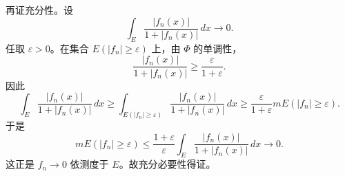 \documentclass{article}
\begin{document}
再证充分性。设
\[
 \int_E\frac{|f_n(x)|}{1+|f_n(x)|}\,dx\to0.
\]
任取 $\varepsilon>0$。在集合 $E(|f_n|\ge\varepsilon)$ 上，由 $\Phi$ 的单调性，
\[
 \frac{|f_n(x)|}{1+|f_n(x)|}\ge \frac{\varepsilon}{1+\varepsilon}.
\]
因此
\[
 \int_E\frac{|f_n(x)|}{1+|f_n(x)|}\,dx
 \ge \int_{E(|f_n|\ge\varepsilon)}\frac{|f_n(x)|}{1+|f_n(x)|}\,dx
 \ge \frac{\varepsilon}{1+\varepsilon}mE(|f_n|\ge\varepsilon).
\]
于是
\[
 mE(|f_n|\ge\varepsilon)
 \le \frac{1+\varepsilon}{\varepsilon}
 \int_E\frac{|f_n(x)|}{1+|f_n(x)|}\,dx\to0.
\]
这正是 $f_n\to0$ 依测度于 $E$。故充分必要性得证。
\end{document}
